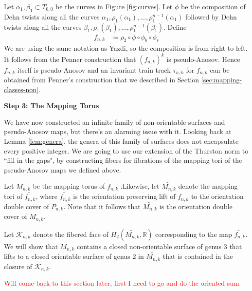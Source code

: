 Let $\alpha_1,\beta_1 \subset T_{0,0}$ be the curves in Figure \ref{fig:curves}. Let $\phi$ be the composition of Dehn twists along all the curves $\alpha_1, \rho_1(\alpha_1), \dots, \rho_1^{n-1}(\alpha_1)$ followed by Dehn twists along all the curves $\beta_1,\rho_1(\beta_1),\dots,\rho_1^{n-1}(\beta_1)$. Define
\begin{align*}
    f_{n,k} &\coloneqq \rho_2 \circ \phi \circ \phi_b \circ \phi_r
\end{align*}
We are using the same notation as Yazdi, so the composition is from right to left. It follows from the Penner construction that $(f_{n,k})^k$ is pseudo-Anosov. Hence $f_{n,k}$ itself is pseudo-Anosov and an invariant train track $\tau_{n,k}$ for $f_{n,k}$ can be obtained from Penner's construction that we described in Section \ref{sec:mapping-classes-non}.

\begin{center}
\textbf{Step 3: The Mapping Torus}
\end{center}

We have now constructed an infinite family of non-orientable surfaces and pseudo-Anosov maps, but there's an alarming issue with it. Looking back at Lemma \ref{lem:genera}, the genera of this family of surfaces does not encapsulate every positive integer. We are going to use our extension of the Thurston norm to ``fill in the gaps", by constructing fibers for fibrations of the mapping tori of the pseudo-Anosov maps we defined above.

Let $M_{n,k}$ be the mapping torus of $f_{n,k}$ .Likewise, let $\widetilde{M_{n,k}}$ denote the mapping tori of $\widetilde{f_{n,k}}$, where $\widetilde{f_{n,k}}$ is the orientation preserving lift of $f_{n,k}$ to the orientation double cover of $P_{n,k}$. Note that it follows that $\widetilde{M_{n,k}}$ is the orientation double cover of $M_{n,k}$.

Let $\mathcal{K}_{n,k}$ denote the fibered face of $H_2(\widetilde{M_{n,k}},\mathbb{R})$ corresponding to the map $\widetilde{f_{n,k}}$. We will show that $M_{n,k}$ contains a closed non-orientable surface of genus 3 that lifts to a closed orientable surface of genus 2 in $\widetilde{M_{n,k}}$ that is contained in the closure of $\mathcal{K}_{n,k}$.

\textcolor{red}{Will come back to this section later, first I need to go and do the oriented sum}

